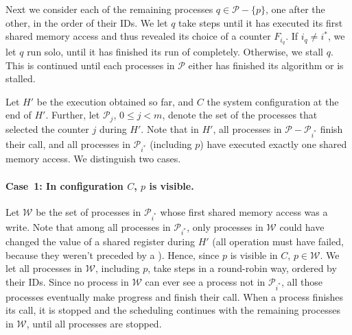 \documentclass[11pt,letterpaper]{article}
\newcommand{\SC}{\text{\tt SC}\xspace}
\newcommand{\LL}{\text{\tt LL}\xspace}
\newcommand{\PP}{\mathcal{P}}
\newcommand{\WW}{\mathcal{W}}
\begin{document}
Next we consider each of the remaining processes $q\in\PP-\{p\}$, one after the other, in the order of their IDs.
We let $q$ take steps until it has executed its first shared memory access and thus revealed its choice of a counter $F_{i_q}$.
If $i_q\neq i^\ast$, we let $q$ run solo, until it has finished its run of \LoadBalance completely.
Otherwise, we stall $q$.
This is continued until each processes in $\PP$ either has finished its \LoadBalance algorithm or is stalled.

Let $H'$ be the execution obtained so far, and $C$ the system configuration at the end of $H'$.
Further, let $\PP_j$, $0\leq j<m$, denote the set of the processes that selected the counter $j$ during $H'$.
Note that in $H'$, all processes in $\PP-\PP_{i^\ast}$ finish their \LoadBalance{} call, and all processes in $\PP_{i^\ast}$ (including $p$) have executed exactly one shared memory access.
We distinguish two cases.

\paragraph{Case~1: In configuration $C$, $p$ is visible.}
Let $\WW$ be the set of processes in $\PP_{i^\ast}$ whose first shared memory access was a write.
Note that among all processes in $\PP_{i^\ast}$, only processes in $\WW$ could have changed the value of a shared register during $H'$  (all \SC operation must have failed, because they weren't preceded by a \LL).
Hence, since $p$ is visible in $C$, $p\in\WW$.
We let all processes in $\WW$, including $p$, take steps in a round-robin way, ordered by their IDs.
Since no process in $\WW$ can ever see a process not in $\PP_{i^\ast}$, all those processes eventually make progress and finish their \FAI{} call.
When a process finishes its \FAI{} call, it is stopped and the scheduling continues with the remaining processes in $\WW$, until all processes are stopped.
\end{document}
